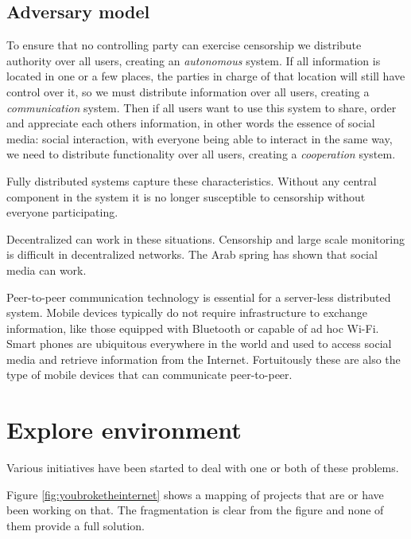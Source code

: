 \subsection{Adversary model}
To ensure that no controlling party can exercise censorship we distribute authority over all users, creating an \emph{autonomous} system.
If all information is located in one or a few places, the parties in charge of that location will still have control over it, so we must distribute information over all users, creating a \emph{communication} system.
Then if all users want to use this system to share, order and appreciate each others information, in other words the essence of social media: social interaction, with everyone being able to interact in the same way, we need to  distribute functionality over all users, creating a \emph{cooperation} system.

Fully distributed systems capture these characteristics.
Without any central component in the system it is no longer susceptible to censorship without everyone participating.

Decentralized can work in these situations.
Censorship and large scale monitoring is difficult in decentralized networks.
The Arab spring has shown that social media can work. \cite{Johan_2001}

Peer-to-peer communication technology is essential for a server-less distributed system.
Mobile devices typically do not require infrastructure to exchange information, like those equipped with Bluetooth or capable of ad hoc Wi-Fi.
Smart phones are ubiquitous everywhere in the world and used to access social media and retrieve information from the Internet.
Fortuitously these are also the type of mobile devices that can communicate peer-to-peer.



\section{Explore environment}

Various initiatives have been started to deal with one or both of these problems. \cite{re_decentralize}

Figure \ref{fig:youbroketheinternet} shows a mapping of projects that are or have been working on that.
The fragmentation is clear from the figure and none of them provide a full solution.

